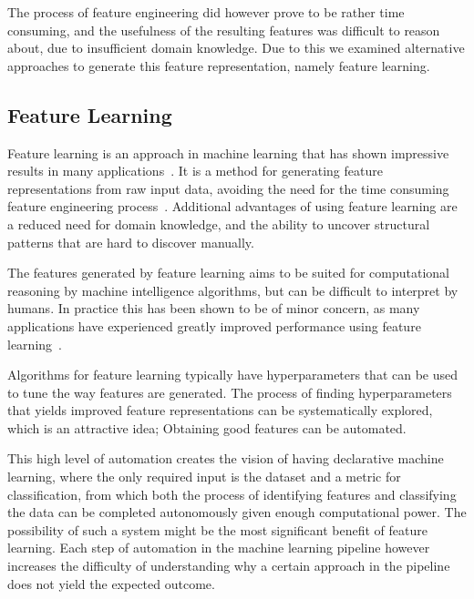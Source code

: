The process of feature engineering did however prove to be rather time consuming, and the usefulness of the resulting features was difficult to reason about, due to insufficient domain knowledge. Due to this we examined alternative approaches to generate this feature representation, namely feature learning.


\subsection{Feature Learning}
Feature learning is an approach in machine learning that has shown impressive results in many applications~\cite{bengio2013representation}. It is a method for generating feature representations from raw input data, avoiding the need for the time consuming feature engineering process~\cite{ng-lecture}. Additional advantages of using feature learning are a reduced need for domain knowledge, and the ability to uncover structural patterns that are hard to discover manually.

The features generated by feature learning aims to be suited for computational reasoning by machine intelligence algorithms, but can be difficult to interpret by humans. In practice this has been shown to be of minor concern, as many applications have experienced greatly improved performance using feature learning~\cite{bengio2013representation}.

Algorithms for feature learning typically have hyperparameters that can be used to tune the way features are generated. The process of finding hyperparameters that yields improved feature representations can be systematically explored, which is an attractive idea; Obtaining good features can be automated.

This high level of automation creates the vision of having declarative machine learning, where the only required input is the dataset and a metric for classification, from which both the process of identifying features and classifying the data can be completed autonomously given enough computational power. The possibility of such a system might be the most significant benefit of feature learning. Each step of automation in the machine learning pipeline however increases the difficulty of understanding why a certain approach in the pipeline does not yield the expected outcome.

